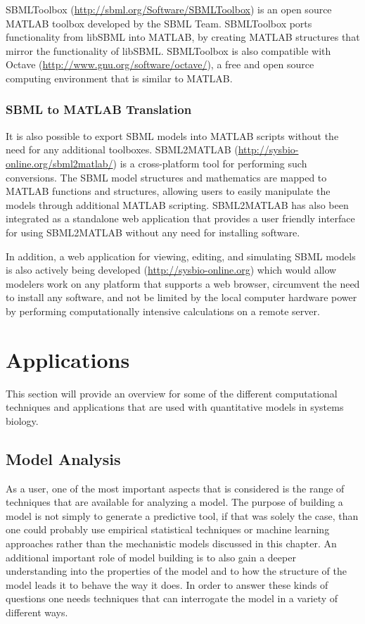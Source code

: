 SBMLToolbox (\url{http://sbml.org/Software/SBMLToolbox})
\autocite{keating2006sbmltoolbox} is an open source MATLAB toolbox
developed by the SBML Team. SBMLToolbox ports functionality from libSBML
into MATLAB, by creating MATLAB structures that mirror the functionality
of libSBML. SBMLToolbox is also compatible with Octave
(\url{http://www.gnu.org/software/octave/}), a free and open source
computing environment that is similar to MATLAB.

\subsubsection{SBML to MATLAB Translation}

It is also possible to export SBML models into MATLAB scripts without
the need for any additional toolboxes. SBML2MATLAB
(\url{http://sysbio-online.org/sbml2matlab/}) is a cross-platform tool
for performing such conversions. The SBML model structures and
mathematics are mapped to MATLAB functions and structures, allowing
users to easily manipulate the models through additional MATLAB
scripting. SBML2MATLAB has also been integrated as a standalone web
application that provides a user friendly interface for using
SBML2MATLAB without any need for installing software.

In addition, a web application for viewing, editing, and simulating SBML
models is also actively being developed (\url{http://sysbio-online.org})
which would allow modelers work on any platform that supports a web
browser, circumvent the need to install any software, and not be limited
by the local computer hardware power by performing computationally
intensive calculations on a remote server.

\section{Applications}

This section will provide an overview for some of the different
computational techniques and applications that are used with
quantitative models in systems biology.

\subsection{Model Analysis}

As a user, one of the most important aspects that is considered is the
range of techniques that are available for analyzing a model. The
purpose of building a model is not simply to generate a predictive tool,
if that was solely the case, than one could probably use empirical
statistical techniques or machine learning approaches rather than the
mechanistic models discussed in this chapter. An additional important
role of model building is to also gain a deeper understanding into the
properties of the model and to how the structure of the model leads it
to behave the way it does. In order to answer these kinds of questions
one needs techniques that can interrogate the model in a variety of
different ways.

